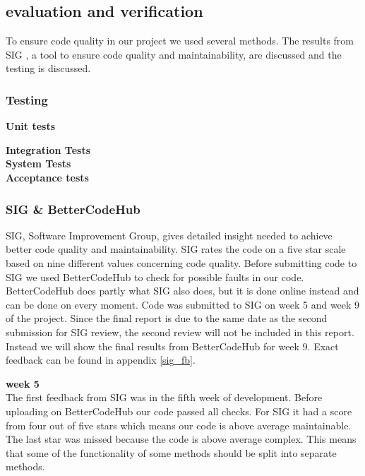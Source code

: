 \subsection{evaluation and verification} \label{eval_veri_results}

To ensure code quality in our project we used several methods. The results from SIG \cite{sig}, a tool to ensure code quality and maintainability, are discussed and the testing is discussed.

\subsubsection{Testing}

\textbf{Unit tests} \\

\textbf{Integration Tests} \\

\textbf{System Tests} \\

\textbf{Acceptance tests} \\



\subsubsection{SIG \& BetterCodeHub}
SIG, Software Improvement Group, gives detailed insight needed to achieve better code quality and maintainability. SIG rates the code on a five star scale based on nine different values concerning code quality. Before submitting code to SIG we used BetterCodeHub\cite{better_code_hub} to check for possible faults in our code. BetterCodeHub does partly what SIG also does, but it is done online instead and can be done on every moment. Code was submitted to SIG on week 5 and week 9 of the project. Since the final report is due to the same date as the second submission for SIG review, the second review will not be included in this report. Instead we will show the final results from BetterCodeHub for week 9. Exact feedback can be found in appendix \ref{sig_fb}.

\textbf{week 5} \\
The first feedback from SIG was in the fifth week of development. Before uploading on BetterCodeHub our code passed all checks. For SIG it had a score from four out of five stars which means our code is above average maintainable. The last star was missed because the code is above average complex. This means that some of the functionality of some methods should be split into separate methods.
 \\

